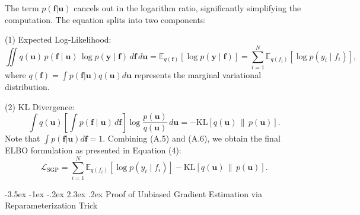 \documentclass[11pt]{article}
\makeatletter
\renewcommand\section{\@startsection {section}{1}{\z@}%
	{-3.5ex \@plus -1ex \@minus -.2ex}%
	{2.3ex \@plus.2ex}%
	{\normalfont\fontfamily{phv}\fontsize{16}{19}\bfseries}}
\makeatother
\begin{document}
	The term $p(\mathbf{f} | \mathbf{u})$ cancels out in the logarithm ratio, significantly simplifying the computation. The equation splits into two components:
	
	(1) Expected Log-Likelihood:
	\begin{equation}
		\iint q(\mathbf{u})\,p(\mathbf{f}\mid \mathbf{u})\,\log p(\mathbf{y}\mid \mathbf{f})\,d\mathbf{f}\,d\mathbf{u}
		= \mathbb{E}_{q(\mathbf{f})}\!\left[\log p(\mathbf{y}\mid \mathbf{f})\right]
		= \sum_{i=1}^{N}\mathbb{E}_{q(f_i)}\!\left[\log p(y_i\mid f_i)\right],
	\end{equation}
	where $q(\mathbf{f}) = \int p(\mathbf{f} | \mathbf{u}) q(\mathbf{u}) d\mathbf{u}$ represents the marginal variational distribution.
	
	(2) KL Divergence:
	\begin{equation}
		\int q(\mathbf{u})\left[\int p(\mathbf{f}\mid \mathbf{u})\,d\mathbf{f}\right]
		\log\frac{p(\mathbf{u})}{q(\mathbf{u})}\,d\mathbf{u}
		= -\mathrm{KL}\!\left[q(\mathbf{u})\,\|\,p(\mathbf{u})\right].
	\end{equation}
	Note that $\int p(\mathbf{f} | \mathbf{u}) d\mathbf{f} = 1$.
	Combining (A.5) and (A.6), we obtain the final ELBO formulation as presented in Equation (4):
	\begin{equation}
		\mathcal{L}_{\mathrm{SGP}}
		= \sum_{i=1}^{N}\mathbb{E}_{q(f_i)}\!\left[\log p(y_i\mid f_i)\right]
		- \mathrm{KL}\!\left[q(\mathbf{u})\,\|\,p(\mathbf{u})\right].
	\end{equation}
	
	
	
	
	
	
	
	
	
	
	\section{Proof of Unbiased Gradient Estimation via Reparameterization Trick} \label{app:B}
	\setcounter{equation}{0}
	
\end{document}
